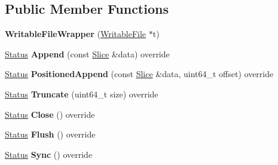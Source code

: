 \subsection*{Public Member Functions}
\begin{DoxyCompactItemize}
\item 
{\bfseries Writable\+File\+Wrapper} (\hyperlink{classrocksdb_1_1WritableFile}{Writable\+File} $\ast$t)\hypertarget{classrocksdb_1_1WritableFileWrapper_a7cb16f393c028b9be2f0af644f6c9895}{}\label{classrocksdb_1_1WritableFileWrapper_a7cb16f393c028b9be2f0af644f6c9895}

\item 
\hyperlink{classrocksdb_1_1Status}{Status} {\bfseries Append} (const \hyperlink{classrocksdb_1_1Slice}{Slice} \&data) override\hypertarget{classrocksdb_1_1WritableFileWrapper_a192786f3933b6a7c9afa515922f05656}{}\label{classrocksdb_1_1WritableFileWrapper_a192786f3933b6a7c9afa515922f05656}

\item 
\hyperlink{classrocksdb_1_1Status}{Status} {\bfseries Positioned\+Append} (const \hyperlink{classrocksdb_1_1Slice}{Slice} \&data, uint64\+\_\+t offset) override\hypertarget{classrocksdb_1_1WritableFileWrapper_a08db5ae7c33a0305524149788fdd5466}{}\label{classrocksdb_1_1WritableFileWrapper_a08db5ae7c33a0305524149788fdd5466}

\item 
\hyperlink{classrocksdb_1_1Status}{Status} {\bfseries Truncate} (uint64\+\_\+t size) override\hypertarget{classrocksdb_1_1WritableFileWrapper_a881f1840a1ad6eb7f3c94d8de1780b8d}{}\label{classrocksdb_1_1WritableFileWrapper_a881f1840a1ad6eb7f3c94d8de1780b8d}

\item 
\hyperlink{classrocksdb_1_1Status}{Status} {\bfseries Close} () override\hypertarget{classrocksdb_1_1WritableFileWrapper_af66c704eb084b526acf57a9a3bb806d8}{}\label{classrocksdb_1_1WritableFileWrapper_af66c704eb084b526acf57a9a3bb806d8}

\item 
\hyperlink{classrocksdb_1_1Status}{Status} {\bfseries Flush} () override\hypertarget{classrocksdb_1_1WritableFileWrapper_ad8a19812190c7b19e4134fd728224890}{}\label{classrocksdb_1_1WritableFileWrapper_ad8a19812190c7b19e4134fd728224890}

\item 
\hyperlink{classrocksdb_1_1Status}{Status} {\bfseries Sync} () override\hypertarget{classrocksdb_1_1WritableFileWrapper_a36c5d1d427609b6ffa552627186deb88}{}\label{classrocksdb_1_1WritableFileWrapper_a36c5d1d427609b6ffa552627186deb88}


\end{DoxyCompactItemize}
